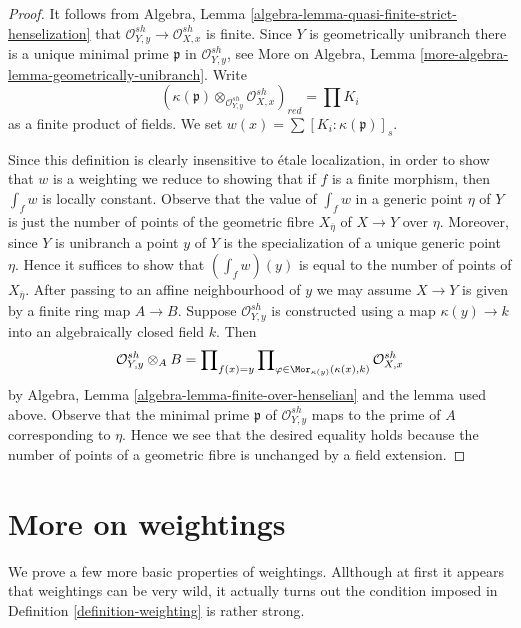 \begin{proof}
It follows from Algebra, Lemma
\ref{algebra-lemma-quasi-finite-strict-henselization}
that $\mathcal{O}_{Y, y}^{sh} \to \mathcal{O}_{X, x}^{sh}$
is finite. Since $Y$ is geometrically unibranch
there is a unique minimal prime $\mathfrak p$ in
$\mathcal{O}_{Y, y}^{sh}$, see
More on Algebra, Lemma \ref{more-algebra-lemma-geometrically-unibranch}.
Write
$$
(\kappa(\mathfrak p) \otimes_{\mathcal{O}_{Y, y}^{sh}}
\mathcal{O}_{X, x}^{sh})_{red} =
\prod K_i
$$
as a finite product of fields.
We set $w(x) = \sum [K_i : \kappa(\mathfrak p)]_s$.

\medskip\noindent
Since this definition is clearly insensitive to \'etale localization,
in order to show that $w$ is a weighting we reduce to showing that if
$f$ is a finite morphism, then $\int_f w$ is locally constant.
Observe that the value of $\int_f w$ in a generic point $\eta$
of $Y$ is just the number of points of the geometric fibre
$X_{\overline{\eta}}$ of $X \to Y$ over $\eta$. Moreover, since
$Y$ is unibranch a point $y$ of $Y$ is the specialization of a unique
generic point $\eta$. Hence it suffices to show that $(\int_f w)(y)$
is equal to the number of points of $X_{\overline{\eta}}$.
After passing to an affine neighbourhood of $y$ we may assume
$X \to Y$ is given by a finite ring map $A \to B$. Suppose
$\mathcal{O}_{Y, y}^{sh}$ is constructed using a map
$\kappa(y) \to k$ into an algebraically closed field $k$.
Then
$$
\mathcal{O}_{Y, y}^{sh} \otimes_A B =
\prod\nolimits_{f(x) = y}
\prod\nolimits_{\varphi \in \Mor_{\kappa(y)}(\kappa(x), k)}
\mathcal{O}_{X, x}^{sh}
$$
by Algebra, Lemma \ref{algebra-lemma-finite-over-henselian}
and the lemma used above.
Observe that the minimal prime $\mathfrak p$ of $\mathcal{O}_{Y, y}^{sh}$
maps to the prime of $A$ corresponding to $\eta$. Hence we see that
the desired equality holds because the number of points of a geometric
fibre is unchanged by a field extension.
\end{proof}



\section{More on weightings}
\label{section-more-weightings}

\noindent
We prove a few more basic properties of weightings. Allthough
at first it appears that weightings can be very wild, it
actually turns out the condition imposed in
Definition \ref{definition-weighting} is rather strong.

